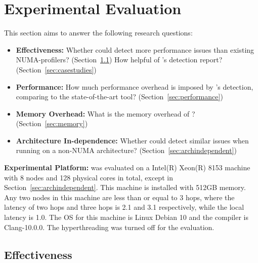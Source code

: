\section{Experimental Evaluation}
\label{sec:evaluation}

This section aims to answer the following research questions: 

\begin{itemize}
\item \textbf{Effectiveness:} Whether \NP{} could detect more performance issues than existing NUMA-profilers? (Section~\ref{effectiveness}) How helpful of \NP{}'s detection report? (Section~\ref{sec:casestudies})
\item \textbf{Performance:} How much performance overhead is imposed by \NP{}'s detection, comparing to the state-of-the-art tool? (Section~\ref{sec:performance}) 
\item \textbf{Memory Overhead:} What is the memory overhead of \NP{}? (Section~\ref{sec:memory})
\item \textbf{Architecture In-dependence:} Whether \NP{} could detect similar issues when running on a non-NUMA architecture? (Section~\ref{sec:archindependent})	
\end{itemize}


\textbf{Experimental Platform:}  \NP{} was evaluated on a Intel(R) Xeon(R) 8153 machine with 8 nodes and 128 physical cores in total, except in Section~\ref{sec:archindependent}. This machine is installed with 512GB memory. Any two nodes in this machine are less than or equal to 3 hops, where the latency of two hops and three hops is 2.1 and 3.1 respectively, while the local latency is 1.0. The OS for this machine is Linux Debian 10 and the compiler is Clang-10.0.0.  The hyperthreading was turned off for the evaluation.

\subsection{Effectiveness}
\label{effectiveness}
%


